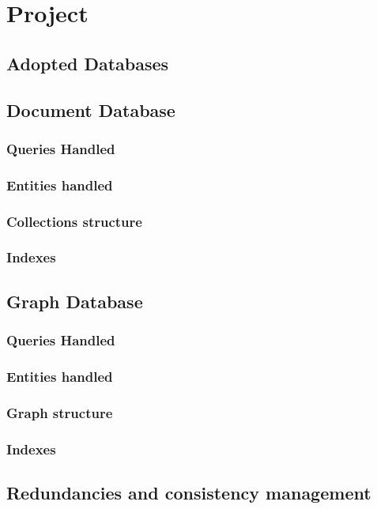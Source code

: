 \section{Project}
\subsection{Adopted Databases}

\subsection{Document Database}
\subsubsection{Queries Handled}
\subsubsection{Entities handled}
\subsubsection{Collections structure}
\subsubsection{Indexes}

\subsection{Graph Database}
\subsubsection{Queries Handled}
\subsubsection{Entities handled}
\subsubsection{Graph structure}
\subsubsection{Indexes}


\subsection{Redundancies and consistency management}

